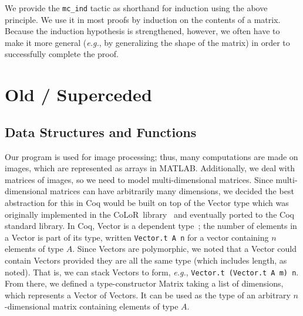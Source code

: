\documentclass[11pt,conference]{IEEEtran}
\newcommand{\matlab}{MATLAB}
\newcommand{\colorlib}{CoLoR}
\theoremstyle{plain} %
\theoremstyle{definition}
\theoremstyle{remark}
\begin{document}
We provide the \texttt{mc\_ind} tactic as shorthand for induction using the
above principle. We use it in most proofs by induction on the contents of a
matrix. Because the induction hypothesis is strengthened, however, we often have
to make it more general (\textit{e.g.}, by generalizing the shape of the matrix)
in order to successfully complete the proof.

\section{Old / Superceded}

\subsection{Data Structures and Functions}

Our program is used for image processing; thus, many computations are made on
images, which are represented as arrays in \matlab\@. Additionally, we deal with
matrices of images, so we need to model multi-dimensional matrices. Since
multi-dimensional matrices can have arbitrarily many dimensions, we decided the
best abstraction for this in Coq would be built on top of the \textsf{Vector}
type which was originally implemented in the \colorlib\
library~\cite{BLANQUI_2011} and eventually ported to the Coq standard library.
In Coq, \textsf{Vector} is a dependent type~\cite{Bove2009,Thorsten_2010}; the
number of elements in a \textsf{Vector} is part of its type, written
\texttt{Vector.t A n} for a vector containing \(n\) elements of type \(A\).
Since \textsf{Vector}s are polymorphic, we noted that a \textsf{Vector} could
contain \textsf{Vector}s provided they are all the same type (which includes
length, as noted). That is, we can stack \textsf{Vector}s to form, \emph{e.g.},
\texttt{Vector.t (Vector.t A m) n}. From there, we defined a type-constructor
\textsf{Matrix} taking a list of dimensions, which represents a \textsf{Vector}
of \textsf{Vector}s. It can be used as the type of an arbitrary
\(n\)-dimensional matrix containing elements of type \(A\).
\end{document}
